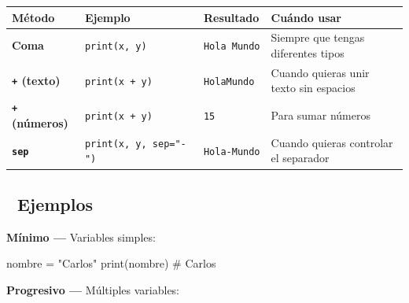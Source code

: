 \documentclass[
  doc,
  floatsintext,
  longtable,
  a4paper,
  nolmodern,
  notxfonts,
  notimes,
  12pt,
  colorlinks=true,linkcolor=blue,citecolor=blue,urlcolor=blue]{apa7}
\newenvironment{Shaded}{\begin{snugshade}}{\end{snugshade}}
\newcommand{\BuiltInTok}[1]{\textcolor[rgb]{0.00,0.23,0.31}{#1}}
\newcommand{\CommentTok}[1]{\textcolor[rgb]{0.37,0.37,0.37}{#1}}
\newcommand{\NormalTok}[1]{\textcolor[rgb]{0.00,0.23,0.31}{#1}}
\newcommand{\OperatorTok}[1]{\textcolor[rgb]{0.37,0.37,0.37}{#1}}
\newcommand{\StringTok}[1]{\textcolor[rgb]{0.13,0.47,0.30}{#1}}
\newcounter{none} %
\begin{document}
{\def\LTcaptype{none} %
\begin{longtable}[]{@{}
  >{\raggedright\arraybackslash}p{}
  >{\raggedright\arraybackslash}p{}
  >{\raggedright\arraybackslash}p{}
  >{\raggedright\arraybackslash}p{}@{}}
\toprule\noalign{}
\begin{minipage}[b]{\linewidth}\raggedright
Método
\end{minipage} & \begin{minipage}[b]{\linewidth}\raggedright
Ejemplo
\end{minipage} & \begin{minipage}[b]{\linewidth}\raggedright
Resultado
\end{minipage} & \begin{minipage}[b]{\linewidth}\raggedright
Cuándo usar
\end{minipage} \\
\midrule\noalign{}
\endhead
\bottomrule\noalign{}
\endlastfoot
\textbf{Coma} & \texttt{print(x,\ y)} & \texttt{Hola\ Mundo} & Siempre
que tengas diferentes tipos \\
\textbf{\texttt{+} (texto)} & \texttt{print(x\ +\ y)} &
\texttt{HolaMundo} & Cuando quieras unir texto sin espacios \\
\textbf{\texttt{+} (números)} & \texttt{print(x\ +\ y)} & \texttt{15} &
Para sumar números \\
\textbf{\texttt{sep}} & \texttt{print(x,\ y,\ sep="-")} &
\texttt{Hola-Mundo} & Cuando quieras controlar el separador \\
\end{longtable}
}

\subsection{🔬 Ejemplos}\label{ejemplos}

\textbf{Mínimo ---} Variables simples:

\begin{Shaded}
\begin{Highlighting}[]
\NormalTok{nombre }\OperatorTok{=} \StringTok{"Carlos"}
\BuiltInTok{print}\NormalTok{(nombre)  }\CommentTok{\# Carlos}
\end{Highlighting}
\end{Shaded}

\textbf{Progresivo ---} Múltiples variables:
\end{document}
